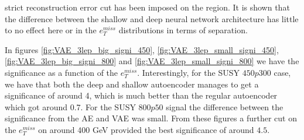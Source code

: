 strict reconstruction error cut has been imposed on the region. It is shown that the 
difference between the shallow and deep neural network architecture has little to no effect 
here or in the $e_T^{miss}$ distributions in terms of separation. \par 
In figures \ref{fig:VAE_3lep_big_signi_450}, \ref{fig:VAE_3lep_small_signi_450}, \ref{fig:VAE_3lep_big_signi_800} and  
\ref{fig:VAE_3lep_small_signi_800} we have the significance as a function of the $e_T^{miss}$.
Interestingly, for the SUSY $450p300$ case, we have that both the deep and shallow 
autoencoder manages to get a significance of around 4, which is much better than the 
regular autoencoder which got around 0.7. For the SUSY $800p50$ signal the difference between the significance 
from the AE and VAE was small. From these figures a further cut on the 
$e_T^{miss}$ on around 400 GeV provided the best significance of around $4.5$. 

